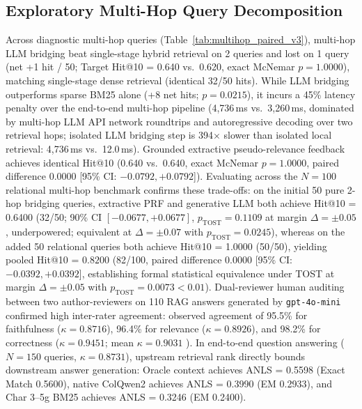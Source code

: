 \subsection{Exploratory Multi-Hop Query Decomposition}
\label{sec:multihop_reasoning}
Across diagnostic multi-hop queries (Table~\ref{tab:multihop_paired_v3}), multi-hop LLM bridging beat single-stage hybrid retrieval on 2 queries and lost on 1 query (net +1 hit / 50; Target Hit@10 = 0.640 vs.\ 0.620, exact McNemar $p = 1.0000$), matching single-stage dense retrieval (identical 32/50 hits). While LLM bridging outperforms sparse BM25 alone (+8 net hits; $p = 0.0215$), it incurs a 45\% latency penalty over the end-to-end multi-hop pipeline (4,736\,ms vs.\ 3,260\,ms, dominated by multi-hop LLM API network roundtrips and autoregressive decoding over two retrieval hops; isolated LLM bridging step is 394$\times$ slower than isolated local retrieval: 4,736\,ms vs.\ 12.0\,ms). Grounded extractive pseudo-relevance feedback achieves identical Hit@10 (0.640 vs.\ 0.640, exact McNemar $p = 1.0000$, paired difference $0.0000$ [95\% CI: $-0.0792, +0.0792$]). Evaluating across the $N=100$ relational multi-hop benchmark confirms these trade-offs: on the initial 50 pure 2-hop bridging queries, extractive PRF and generative LLM both achieve Hit@10 = 0.6400 (32/50; 90\% CI $[-0.0677, +0.0677]$, $p_{\text{TOST}}=0.1109$ at margin $\Delta=\pm 0.05$, underpowered; equivalent at $\Delta=\pm 0.07$ with $p_{\text{TOST}}=0.0245$), whereas on the added 50 relational queries both achieve Hit@10 = 1.0000 (50/50), yielding pooled Hit@10 = $0.8200$ (82/100, paired difference $0.0000$ [95\% CI: $-0.0392, +0.0392$], establishing formal statistical equivalence under TOST at margin $\Delta = \pm 0.05$ with $p_{\text{TOST}} = 0.0073 < 0.01$). Dual-reviewer human auditing between two author-reviewers on 110 RAG answers generated by \texttt{gpt-4o-mini} confirmed high inter-rater agreement: observed agreement of 95.5\% for faithfulness ($\kappa = 0.8716$), 96.4\% for relevance ($\kappa = 0.8926$), and 98.2\% for correctness ($\kappa = 0.9451$; mean $\kappa = 0.9031$ \cite{zheng2023judging}). In end-to-end question answering ($N=150$ queries, $\kappa=0.8731$), upstream retrieval rank directly bounds downstream answer generation: Oracle context achieves ANLS = 0.5598 (Exact Match 0.5600), native ColQwen2 achieves ANLS = 0.3990 (EM 0.2933), and Char 3--5g BM25 achieves ANLS = 0.3246 (EM 0.2400).

